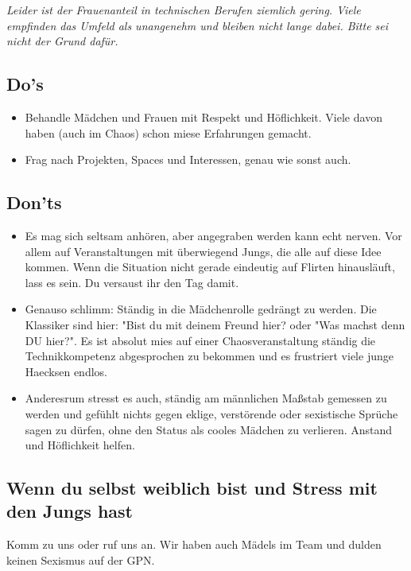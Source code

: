 \documentclass[10pt]{leaflet}
\begin{document}
\emph{Leider ist der Frauenanteil in technischen Berufen ziemlich
  gering. Viele empfinden das Umfeld als unangenehm und bleiben nicht
  lange dabei. Bitte sei nicht der Grund dafür.}

\subsection{Do's}
\label{sec-2-1}
\begin{itemize}
\item Behandle Mädchen und Frauen mit Respekt und Höflichkeit. Viele davon
haben (auch im Chaos) schon miese Erfahrungen gemacht.
\item Frag nach Projekten, Spaces und Interessen, genau wie sonst auch.
\end{itemize}
\subsection{Don'ts}
\label{sec-2-2}
\begin{itemize}
\item Es mag sich seltsam anhören, aber angegraben werden kann echt
  nerven. Vor allem auf Veranstaltungen mit überwiegend Jungs, die
  alle auf diese Idee kommen. Wenn die Situation nicht gerade
  eindeutig auf Flirten hinausläuft, lass es sein. Du versaust ihr den
  Tag damit.
\item Genauso schlimm: Ständig in die Mädchenrolle gedrängt zu
  werden. Die Klassiker sind hier: "Bist du mit deinem Freund hier?
  oder "Was machst denn DU hier?". Es ist absolut mies auf einer
  Chaosveranstaltung ständig die Technikkompetenz abgesprochen zu
  bekommen und es frustriert viele junge Haecksen endlos.
\item Anderesrum stresst es auch, ständig am männlichen Maßstab
  gemessen zu werden und gefühlt nichts gegen eklige, verstörende
  oder sexistische Sprüche  sagen zu dürfen, ohne den Status als cooles
  Mädchen zu verlieren. Anstand und Höflichkeit helfen.
\end{itemize}

\subsection{Wenn du selbst weiblich bist und Stress mit den Jungs hast}
Komm zu uns oder ruf uns an. Wir haben auch Mädels im Team und dulden
keinen Sexismus auf der GPN.
\end{document}
